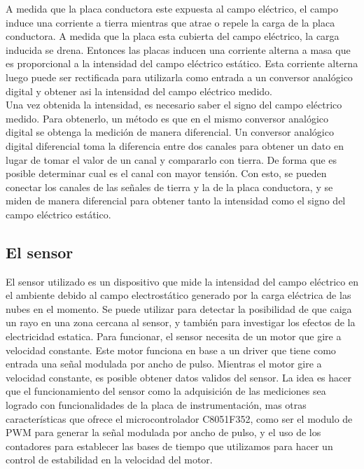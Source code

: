 A medida que la placa conductora este expuesta al campo eléctrico, el campo induce una corriente a tierra mientras que atrae o repele la carga de la placa conductora. A medida que la placa esta cubierta del campo eléctrico, la carga inducida se drena. Entonces las placas inducen una corriente alterna a masa que es proporcional a la intensidad del campo eléctrico estático. Esta corriente alterna luego puede ser rectificada para utilizarla como entrada a un conversor analógico digital y obtener asi la intensidad del campo eléctrico medido. \\

Una vez obtenida la intensidad, es necesario saber el signo del campo eléctrico medido. Para obtenerlo, un método es que en el mismo conversor analógico digital se obtenga la medición de manera diferencial. Un conversor analógico digital diferencial toma la diferencia entre dos canales para obtener un dato en lugar de tomar el valor de un canal y compararlo con tierra. De forma que es posible determinar cual es el canal con mayor tensión. Con esto, se pueden conectar los canales de las señales de tierra y la de la placa conductora, y se miden de manera diferencial para obtener tanto la intensidad como el signo del campo eléctrico estático.
\cite{fieldmill}

\subsection{El sensor} %
\label{it6:sub:el_sensor}

El sensor utilizado es un dispositivo que mide la intensidad del campo eléctrico en el ambiente debido al campo electrostático generado por la carga eléctrica de las nubes en el momento. Se puede utilizar para detectar la posibilidad de que caiga un rayo en una zona cercana al sensor, y también para investigar los efectos de la electricidad estatica. Para funcionar, el sensor necesita de un motor que gire a velocidad constante. Este motor funciona en base a un driver que tiene como entrada una señal modulada por ancho de pulso.
Mientras el motor gire a velocidad constante, es posible obtener datos validos del sensor. La idea es hacer que el funcionamiento del sensor como la adquisición de las mediciones sea logrado con funcionalidades de la placa de instrumentación, mas otras características que ofrece el microcontrolador C8051F352, como ser el modulo de PWM para generar la señal modulada por ancho de pulso, y el uso de los contadores para establecer las bases de tiempo que utilizamos para hacer un control de estabilidad en la velocidad del motor. \\


